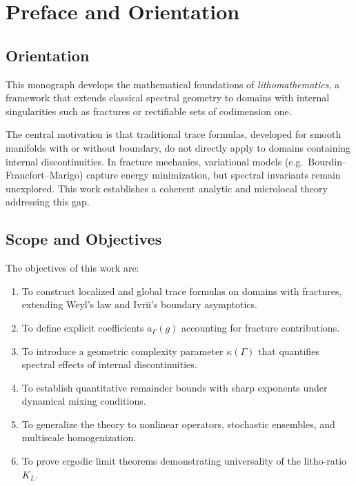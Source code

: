 
\chapter*{Preface and Orientation}
\label{chap:preface}

\section*{Orientation}

This monograph develops the mathematical foundations of
\emph{lithomathematics}, a framework that extends classical spectral
geometry to domains with internal singularities such as fractures or
rectifiable sets of codimension one. 

The central motivation is that traditional trace formulas, developed for
smooth manifolds with or without boundary, do not directly apply to
domains containing internal discontinuities. In fracture mechanics,
variational models (e.g.~Bourdin–Francfort–Marigo) capture energy
minimization, but spectral invariants remain unexplored. This work
establishes a coherent analytic and microlocal theory addressing this
gap.

\section*{Scope and Objectives}

The objectives of this work are:

\begin{enumerate}
    \item To construct localized and global trace formulas on domains with
    fractures, extending Weyl’s law and Ivrii’s boundary asymptotics.
    \item To define explicit coefficients $a_\Gamma(g)$ accounting for
    fracture contributions.
    \item To introduce a geometric complexity parameter $\kappa(\Gamma)$
    that quantifies spectral effects of internal discontinuities.
    \item To establish quantitative remainder bounds with sharp exponents
    under dynamical mixing conditions.
    \item To generalize the theory to nonlinear operators, stochastic
    ensembles, and multiscale homogenization.
    \item To prove ergodic limit theorems demonstrating universality of
    the litho-ratio $K_L$.
\end{enumerate}

